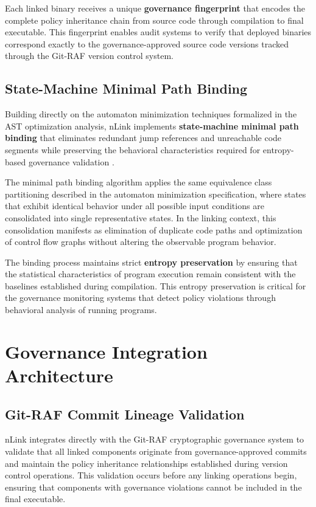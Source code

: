 Each linked binary receives a unique \textbf{governance fingerprint} that encodes the complete policy inheritance chain from source code through compilation to final executable. This fingerprint enables audit systems to verify that deployed binaries correspond exactly to the governance-approved source code versions tracked through the Git-RAF version control system.

\subsection{State-Machine Minimal Path Binding}

Building directly on the automaton minimization techniques formalized in the AST optimization analysis, nLink implements \textbf{state-machine minimal path binding} that eliminates redundant jump references and unreachable code segments while preserving the behavioral characteristics required for entropy-based governance validation \cite{TODO:minimal-path-binding-spec}.

The minimal path binding algorithm applies the same equivalence class partitioning described in the automaton minimization specification, where states that exhibit identical behavior under all possible input conditions are consolidated into single representative states. In the linking context, this consolidation manifests as elimination of duplicate code paths and optimization of control flow graphs without altering the observable program behavior.

The binding process maintains strict \textbf{entropy preservation} by ensuring that the statistical characteristics of program execution remain consistent with the baselines established during compilation. This entropy preservation is critical for the governance monitoring systems that detect policy violations through behavioral analysis of running programs.

\section{Governance Integration Architecture}

\subsection{Git-RAF Commit Lineage Validation}

nLink integrates directly with the Git-RAF cryptographic governance system to validate that all linked components originate from governance-approved commits and maintain the policy inheritance relationships established during version control operations. This validation occurs before any linking operations begin, ensuring that components with governance violations cannot be included in the final executable.

